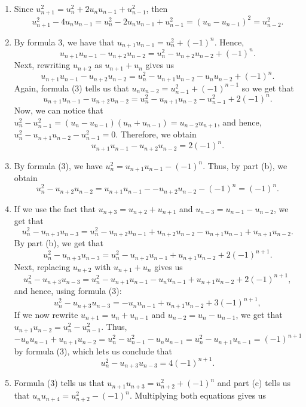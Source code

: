 \begin{solution}
    \begin{enumerate}
        \item Since $u_{n + 1}^2 = u_n^2 + 2u_n u_{n-1} + u_{n-1}^2$, then
        $$u_{n + 1}^2 - 4u_nu_{n-1} = u_n^2 - 2u_n u_{n-1} + u_{n-1}^2 = (u_n - u_{n-1})^2 = u_{n-2}^2.$$ 
        \item By formula 3, we have that $u_{n+1}u_{n-1} = u_n^2 + (-1)^n$. Hence,
        $$u_{n+1}u_{n-1} - u_{n+2}u_{n-2} = u_n^2 - u_{n+2}u_{n-2} + (-1)^n.$$
        Next, rewriting $u_{n+2}$ as $u_{n+1} + u_n$ gives us
        $$u_{n+1}u_{n-1} - u_{n+2}u_{n-2} = u_n^2 - u_{n+1}u_{n-2} - u_nu_{n-2} + (-1)^n.$$
        Again, formula (3) tells us that $u_n u_{n-2} = u_{n-1}^2 + (-1)^{n-1}$ so we get that 
        $$u_{n+1}u_{n-1} - u_{n+2}u_{n-2} = u_n^2 - u_{n+1}u_{n-2} - u_{n-1}^2 + 2(-1)^n.$$
        Now, we can notice that $u_n^2 - u_{n-1}^2 = (u_n - u_{n-1})(u_n + u_{n-1}) = u_{n-2}u_{n+1}$, and hence, $u_n^2 - u_{n+1}u_{n-2}- u_{n-1}^2 = 0$. Therefore, we obtain
        $$u_{n+1}u_{n-1} - u_{n+2}u_{n-2} = 2(-1)^n.$$
        \item By formula (3), we have $u_n^2 = u_{n+1}u_{n-1} - (-1)^n$. Thus, by part (b), we obtain
        $$u_n^2 - u_{n+2}u_{n-2} = u_{n+1}u_{n-1} - - u_{n+2}u_{n-2} - (-1)^n = (-1)^n.$$
        \item If we use the fact that $u_{n+3} = u_{n+2} + u_{n+1}$ and $u_{n-3} = u_{n-1} - u_{n-2}$, we get that
        $$u_n^2 - u_{n+3}u_{n-3} = u_n^2 - u_{n+2}u_{n-1} + u_{n+2}u_{n-2} - u_{n + 1}u_{n-1} + u_{n+1}u_{n-2}.$$
        By part (b), we get that 
        $$u_n^2 - u_{n+3}u_{n-3} = u_n^2 - u_{n+2}u_{n-1} + u_{n+1}u_{n-2} + 2(-1)^{n+1}.$$
        Next, replacing $u_{n+2}$ with $u_{n+1} + u_n$ gives us
        $$u_n^2 - u_{n+3}u_{n-3} = u_n^2 - u_{n+1}u_{n-1} - u_nu_{n-1} + u_{n+1}u_{n-2} + 2(-1)^{n+1},$$
        and hence, using formula (3):
        $$u_n^2 - u_{n+3}u_{n-3} =  - u_nu_{n-1} + u_{n+1}u_{n-2} + 3(-1)^{n+1},$$
        If we now rewrite $u_{n+1} = u_n + u_{n-1}$ and $u_{n-2} = u_n - u_{n-1}$, we get that $u_{n+1}u_{n-2} = u_n^2 - u_{n-1}^2$. Thus,
        $$-u_nu_{n-1} + u_{n+1}u_{n-2} = u_n^2 - u_{n-1}^2 - u_nu_{n-1} = u_n^2 - u_{n+1}u_{n-1} = (-1)^{n+1}$$
        by formula (3), which lets us conclude that
        $$u_n^2 - u_{n+3}u_{n-3} = 4(-1)^{n+1}.$$
        \item Formula (3) tells us that $u_{n+1}u_{n+3} = u_{n+2}^2 + (-1)^n$ and part (c) tells us that $u_nu_{n+4} = u_{n+2}^2 - (-1)^n$. Multiplying both equations gives us 

\end{enumerate}
\end{solution}
